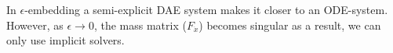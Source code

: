 In $\epsilon$-embedding a semi-explicit DAE system makes it closer to an ODE-system. However, as $\epsilon \rightarrow 0$, the mass matrix ($F_{\dot x}$) becomes singular as a result, we can only use implicit solvers. 